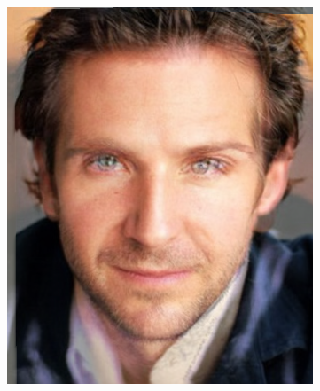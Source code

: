 \documentclass[conference]{IEEEtran}
\begin{document}
\begin{figure}[H]
\begin{multicols}{3}
    \includegraphics[width=1.0\linewidth]{results/faces/G/img30.png} \par
    

\end{multicols}
\end{figure}
\end{document}
